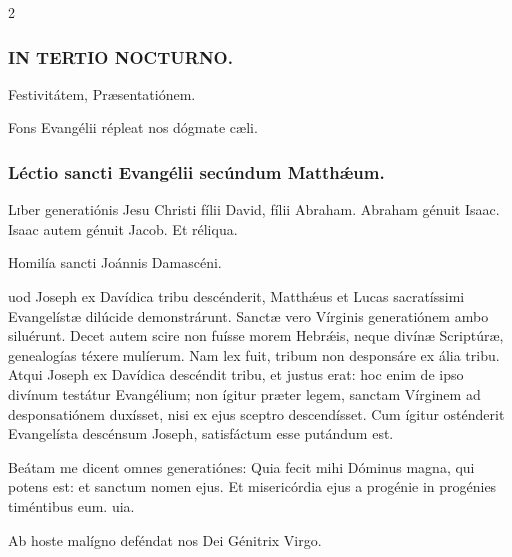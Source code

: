 \documentclass[9pt,twoside]{extarticle}
\begin{document}
\begin{multicols}{2}
\subsubsection*{\center \textsc{IN TERTIO NOCTURNO.}}
\begin{tightlist}{}
\item {} Festivitátem,  Præsentatiónem.
\item {\small {} Fons Evangélii répleat nos dógmate cæli.}
\end{tightlist}

\subsubsection*{\center Léctio sancti Evangélii secúndum Matthǽum.}
\begin{center} \hfill {}\end{center}
\lettrine{L}iber generatiónis Jesu Christi fílii David, fílii Abraham. Abraham génuit Isaac. Isaac autem génuit Jacob. Et réliqua. 

\begin{center}Homilía sancti Joánnis Damascéni.\\
\end{center}

uod Joseph ex Davídica tribu descénderit, Matthǽus et Lucas sacratíssimi Evangelístæ dilúcide demonstrárunt. Sanctæ vero Vírginis generatiónem ambo siluérunt. Decet autem scire non fuísse morem Hebrǽis, neque divínæ Scriptúræ, genealogías téxere mulíerum. Nam lex fuit, tribum non desponsáre ex ália tribu. Atqui Joseph ex Davídica descéndit tribu, et justus erat: hoc enim de ipso divínum testátur Evangélium; non ígitur præter legem, sanctam Vírginem ad desponsatiónem duxísset, nisi ex ejus sceptro descendísset. Cum ígitur osténderit Evangelísta descénsum Joseph, satisfáctum esse putándum est.

\begin{tightlist}{}
\item {} Beátam me dicent omnes generatiónes: \textred{*} Quia fecit mihi Dóminus magna, qui potens est: et sanctum nomen ejus.  Et misericórdia ejus a progénie in progénies timéntibus eum. uia.
\item {\small {} Ab hoste malígno deféndat nos Dei Génitrix Virgo.}
\end{tightlist}


\end{multicols}
\end{document}
